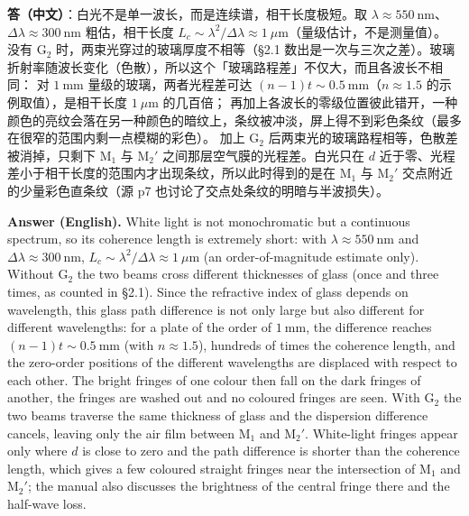 \documentclass[11pt]{ctexart}
\newcommand{\Dl}{d}
\newcommand{\qaneed}[1]{\needspace{#1\textheight}}
\begin{document}
\qaneed{0.74}


\textbf{答（中文）}：白光不是单一波长，而是连续谱，相干长度极短。取 $\lambda\approx550\ \mathrm{nm}$、$\Delta\lambda\approx300\ \mathrm{nm}$ 粗估，相干长度 $L_c\sim\lambda^2/\Delta\lambda\approx1\ \mu\mathrm{m}$（量级估计，不是测量值）。
没有 G$_2$ 时，两束光穿过的玻璃厚度不相等（§2.1 数出是一次与三次之差）。玻璃折射率随波长变化（色散），所以这个「玻璃路程差」不仅大，而且各波长不相同：
对 $1\ \mathrm{mm}$ 量级的玻璃，两者光程差可达 $(n-1)t\sim0.5\ \mathrm{mm}$（$n\approx1.5$ 的示例取值），是相干长度 $1\ \mu\mathrm{m}$ 的几百倍；
再加上各波长的零级位置彼此错开，一种颜色的亮纹会落在另一种颜色的暗纹上，条纹被冲淡，屏上得不到彩色条纹（最多在很窄的范围内剩一点模糊的彩色）。
加上 G$_2$ 后两束光的玻璃路程相等，色散差被消掉，只剩下 M$_1$ 与 M$_2'$ 之间那层空气膜的光程差。白光只在 $\Dl$ 近于零、光程差小于相干长度的范围内才出现条纹，所以此时得到的是在 M$_1$ 与 M$_2'$ 交点附近的少量彩色直条纹（源 p7 也讨论了交点处条纹的明暗与半波损失）。

\textbf{Answer (English).} White light is not monochromatic but a continuous spectrum, so its coherence length is extremely short: with $\lambda\approx550\ \mathrm{nm}$ and $\Delta\lambda\approx300\ \mathrm{nm}$, $L_c\sim\lambda^2/\Delta\lambda\approx1\ \mu\mathrm{m}$ (an order-of-magnitude estimate only).
Without G$_2$ the two beams cross different thicknesses of glass (once and three times, as counted in §2.1). Since the refractive index of glass depends on wavelength, this glass path difference is not only large but also different for different wavelengths: for a plate of the order of $1\ \mathrm{mm}$, the difference reaches $(n-1)t\sim0.5\ \mathrm{mm}$ (with $n\approx1.5$), hundreds of times the coherence length, and the zero-order positions of the different wavelengths are displaced with respect to each other. The bright fringes of one colour then fall on the dark fringes of another, the fringes are washed out and no coloured fringes are seen.
With G$_2$ the two beams traverse the same thickness of glass and the dispersion difference cancels, leaving only the air film between M$_1$ and M$_2'$. White-light fringes appear only where $\Dl$ is close to zero and the path difference is shorter than the coherence length, which gives a few coloured straight fringes near the intersection of M$_1$ and M$_2'$; the manual also discusses the brightness of the central fringe there and the half-wave loss.
\end{document}
